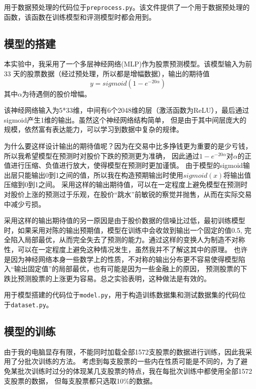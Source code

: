\documentclass[final,5p,times,twocolumn,authoryear]{elsarticle}
\begin{document}
用于数据预处理的代码位于\texttt{preprocess.py}。该文件提供了一个用于数据预处理的函数，该函数在训练模型和评测模型时都会用到。

\subsection{模型的搭建}
本实验中，我采用了一个多层神经网络(MLP)作为股票预测模型。该模型输入为前 33 天的股票数据（经过预处理，所以都是增幅数据），输出的期待值
\begin{equation}
       y = sigmoid(1 - e^{-20\alpha})
\end{equation}
其中\(\alpha\)为待遇侧的股价增幅。

该神经网络输入为5*33维，中间有6个2048维的层（激活函数为ReLU），最后通过sigmoid产生1维的输出。虽然这个神经网络结构简单，
但是由于其中间层庞大的规模，依然富有表达能力，可以学习到数据中复杂的规律。

为什么要这样设计输出的期待值呢？因为在交易中比多挣钱更为重要的是少亏钱，所以我希望模型在预测时对股价下跌的预测更为准确，
因此通过\(1 - e^{-20\alpha}\)对\(\alpha\)的正值进行压缩、负值进行放大，使得模型在预测时更加谨慎。
由于模型的sigmoid输出层只能输出0到1之间的值，所以我在构造预期输出时使用\(sigmoid(x)\)将输出值压缩到0到1之间。
采用这样的输出期待值，可以在一定程度上避免模型在预测时对股价上涨的预测过于乐观，在股价“跳水”前敏锐的察觉并抛售，从而在实际交易中减少亏损。

采用这样的输出期待值的另一原因是由于股价数据的信噪比过低，最初训练模型时，如果采用对陈的输出预期值，模型在训练中会收敛到输出一个固定的值0.5,
完全陷入局部最优，从而完全失去了预测的能力。通过这样的变换人为制造不对称性，可以在一定程度上避免这种情况发生，虽然我并不了解这其中的原理。
也许是因为神经网络本身一些数学上的性质，不对称的输出分布更不容易使得模型陷入“输出固定值”的局部最优，也有可能是因为一些金融上的原因，
预测股票的下跌比预测股票的上涨更为容易。总之实验表明，这种做法是有效的。

用于模型搭建的代码位于\texttt{model.py}，用于构造训练数据集和测试数据集的代码位于\texttt{dataset.py}。

\subsection{模型的训练}
由于我的电脑显存有限，不能同时加载全部1572支股票的数据进行训练，因此我采用了分批次训练的方法。
考虑到每支股票的一些内在性质可能是不同的，为了避免某批次训练时过分的体现某几支股票的特点，我在每批次训练中都使用全部1572支股票的数据，
但每支股票都只选取10\%的数据。
\end{document}

